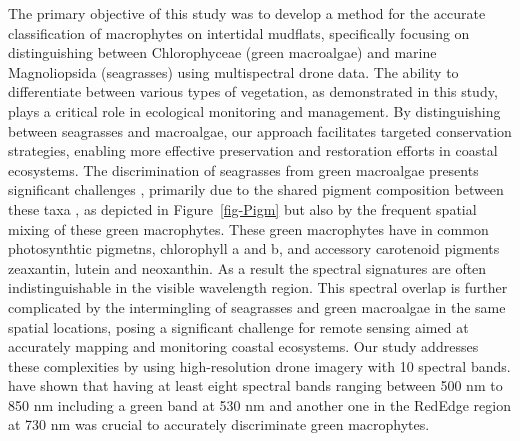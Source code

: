 \documentclass[
  number]{elsarticle}
\begin{document}
The primary objective of this study was to develop a method for the
accurate classification of macrophytes on intertidal mudflats,
specifically focusing on distinguishing between Chlorophyceae (green
macroalgae) and marine Magnoliopsida (seagrasses) using multispectral
drone data. The ability to differentiate between various types of
vegetation, as demonstrated in this study, plays a critical role in
ecological monitoring and management. By distinguishing between
seagrasses and macroalgae, our approach facilitates targeted
conservation strategies, enabling more effective preservation and
restoration efforts in coastal ecosystems. The discrimination of
seagrasses from green macroalgae presents significant challenges
\citetext{\citealp[ ]{oiry2021using}; \citealp{Bannari2022}}, primarily
due to the shared pigment composition between these taxa
\citep{mckenzie2020global}, as depicted in Figure~\ref{fig-Pigm} but
also by the frequent spatial mixing of these green macrophytes. These
green macrophytes have in common photosynthtic pigmetns, chlorophyll a
and b, and accessory carotenoid pigments zeaxantin, lutein and
neoxanthin. As a result the spectral signatures are often
indistinguishable in the visible wavelength region. This spectral
overlap is further complicated by the intermingling of seagrasses and
green macroalgae in the same spatial locations, posing a significant
challenge for remote sensing aimed at accurately mapping and monitoring
coastal ecosystems. Our study addresses these complexities by using
high-resolution drone imagery with 10 spectral bands. \citep{Davies2023}
have shown that having at least eight spectral bands ranging between 500
nm to 850 nm including a green band at 530 nm and another one in the
RedEdge region at 730 nm was crucial to accurately discriminate green
macrophytes.
\end{document}
